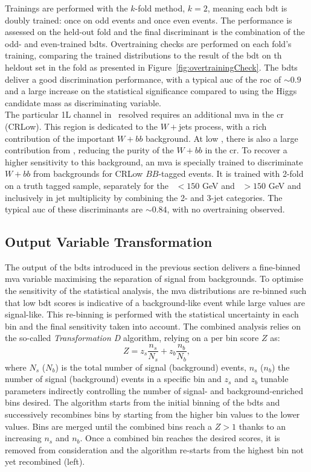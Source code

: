 Trainings are performed with the $k$-fold method, $k = 2$, meaning each \gls{bdt} is doubly trained: once on odd events and once even events. The performance is assessed on the held-out fold and the final discriminant is the combination of the odd- and even-trained \gls{bdt}s. Overtraining checks are performed on each fold's training, comparing the trained distributions to the result of the \gls{bdt} on th heldout set in the fold as presented in Figure~\ref{fig:overtrainingCheck}. The \gls{bdt}s deliver a good discrimination performance, with a typical \gls{auc} of the \gls{roc} of $\sim0.9$ and a large increase on the statistical significance compared to using the Higgs candidate mass as discriminating variable. \\
  
The particular 1L channel in \vhb\ resolved requires an additional \gls{mva} in the \lowdr \gls{cr} (CRLow). This region is dedicated to the $W+$jets process, with a rich contribution of the important $W+bb$ background. At low \ptv, there is also a large contribution from \ttb, reducing the purity of the $W+bb$ in the \gls{cr}. To recover a higher sensitivity to this background, an \gls{mva} is specially trained to discriminate $W+bb$ from backgrounds for CRLow $BB$-tagged events. It is trained with 2-fold on a truth tagged sample, separately for the \ptv\ $< 150$ GeV and \ptv\ $> 150$ GeV and inclusively in jet multiplicity by combining the 2- and 3-jet categories. The typical \gls{auc} of these discriminants are $\sim0.84$, with no overtraining observed.

\subsection{Output Variable Transformation}
The output of the \gls{bdt}s introduced in the previous section delivers a fine-binned \gls{mva} variable maximising the separation of signal from backgrounds. To optimise the sensitivity of the statistical analysis, the \gls{mva} distributions are re-binned such that low \gls{bdt} scores is indicative of a background-like event while large values are signal-like. This re-binning is performed with the statistical uncertainty in each bin and the final sensitivity taken into account. The combined analysis relies on the so-called \textit{Transformation D} algorithm, relying on a per bin score $Z$ as:
\begin{equation}
    Z = z_s \frac{n_s}{N_s} + z_b \frac{n_b}{N_b},
\end{equation} 
where $N_s$ ($N_b$) is the total number of signal (background) events, $n_s$ ($n_b$) the number of signal (background) events in a specific bin and $z_s$ and $z_b$ tunable parameters indirectly controlling the number of signal- and background-enriched bins desired. The algorithm starts from the initial binning of the \gls{bdt}s and successively recombines bins by starting from the higher bin values to the lower values. Bins are merged until the combined bins reach a $Z > 1$ thanks to an increasing $n_s$ and $n_b$. Once a combined bin reaches the desired scores, it is removed from consideration and the algorithm re-starts from the highest bin not yet recombined (left).\\

